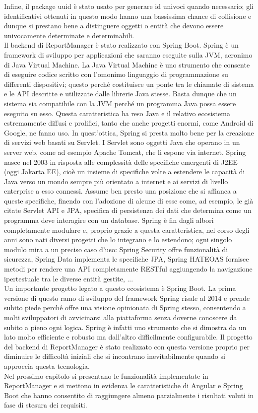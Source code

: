 Infine, il package uuid è stato usato per generare id univoci quando necessario; gli identificativi ottenuti in questo modo hanno una bassissima chance di collisione e dunque si
prestano bene a distinguere oggetti o entità che devono essere univocamente determinate e determinabili.
\\
Il backend di ReportManager è stato realizzato con Spring Boot.
Spring è un framework di sviluppo per applicazioni che saranno eseguite sulla JVM, acronimo di Java Virtual Machine.
La Java Virtual Machine è uno strumento che consente di eseguire codice scritto con l'omonimo linguaggio di programmazione su differenti dispositivi; questo perché costituisce un ponte
tra le chiamate di sistema e le API descritte e utilizzate dalle librerie Java stesse.
Basta dunque che un sistema sia compatibile con la JVM perché un programma Java possa essere eseguito su esso.
Questa caratteristica ha reso Java e il relativo ecosistema estremamente diffusi e prolifici, tanto che anche progetti enormi, come Android di Google, ne fanno uso.
In quest'ottica, Spring si presta molto bene per la creazione di servizi web basati su Servlet.
I Servlet sono oggetti Java che operano in un server web, come ad esempio Apache Tomcat, che li espone via internet.
Spring nasce nel 2003 in risposta alle complessità delle specifiche emergenti di J2EE (oggi Jakarta EE), cioè un insieme di specifiche volte a estendere le capacità di Java verso un mondo sempre più
orientato a internet e ai servizi di livello enterprise a esso connessi.
Assume ben presto una posizione che si affianca a queste specifiche, finendo con l'adozione di alcune di esse come, ad esempio, le già citate Servlet API e JPA, specifica di persistenza
dei dati che determina come un programma deve interagire con un database.
Spring è fin dagli albori completamente modulare e, proprio grazie a questa caratteristica, nel corso degli anni sono nati diversi progetti che lo integrano e lo estendono;
ogni singolo modulo mira a un preciso caso d'uso: Spring Security offre funzionalità di sicurezza, Spring Data implementa le specifiche JPA, Spring HATEOAS fornisce metodi per rendere
una API completamente RESTful aggiungendo la navigazione ipertestuale tra le diverse entità gestite, ...
\\
Un importante progetto legato a questo ecosistema è Spring Boot.
La prima versione di questo ramo di sviluppo del framework Spring risale al 2014 e prende subito piede perché offre una visione opinionata di Spring stesso, consentendo a molti
sviluppatori di avvicinarsi alla piattaforma senza doverne conoscere da subito a pieno ogni logica.
Spring è infatti uno strumento che si dimostra da un lato molto efficiente e robusto ma dall'altro difficilmente configurabile.
Il progetto del backend di ReportManager è stato realizzato con questa versione proprio per diminuire le difficoltà iniziali che si incontrano inevitabilmente
quando si approccia questa tecnologia.
\\
Nel prossimo capitolo si presentano le funzionalità implementate in ReportManager e si mettono in evidenza le caratteristiche di Angular e Spring Boot che hanno consentito di raggiungere
almeno parzialmente i risultati voluti in fase di stesura dei requisiti.